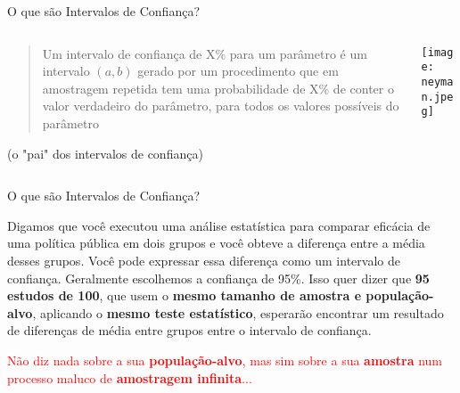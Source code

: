 \begin{frame}{O que são Intervalos de Confiança?}
    \begin{columns}
        \begin{column}{0.8\textwidth}
            \begin{defn}
                \begin{quotation}
                    Um intervalo de confiança de X\% para um parâmetro é um intervalo
                    $(a, b)$ gerado por um procedimento que em amostragem repetida
                    tem uma probabilidade de X\% de conter o valor verdadeiro do
                    parâmetro, para todos os valores possíveis do parâmetro
                \end{quotation}
                \vfill \vfill
                \textcite{neyman1937outline} (o "pai" dos intervalos de confiança)
            \end{defn}
        \end{column}
        \begin{column}{0.2\textwidth}
            \centering
            \texttt{[image: neyman.jpeg]}
        \end{column}
    \end{columns}
\end{frame}

\begin{frame}{O que são Intervalos de Confiança?}
    \begin{exemplo}
        Digamos que você executou uma análise estatística para comparar
        eficácia de uma política pública em dois grupos e você obteve a
        diferença entre a média desses grupos. Você pode expressar essa
        diferença como um intervalo de confiança. Geralmente escolhemos a
        confiança de 95\%. Isso quer dizer que \textbf{95 estudos de 100},
        que usem o \textbf{mesmo tamanho de amostra e população-alvo},
        aplicando o \textbf{mesmo teste estatístico}, esperarão encontrar
        um resultado de diferenças de média entre grupos entre o intervalo
        de confiança.
    \end{exemplo}
    \footnotesize \textcolor{red}{Não diz nada sobre a sua \textbf{população-alvo},
    mas sim sobre a sua \textbf{amostra} num processo maluco de \textbf{amostragem infinita}...}
\end{frame}

